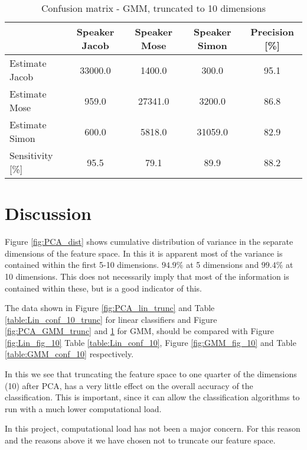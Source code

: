 \begin{table}[H]                                                    
\centering                                                          
\begin{tabular}{|l|c|c|c|c|}                                        
\hline                                                              
  & Speaker Jacob & Speaker Mose & Speaker Simon & Precision [\%] \\
\hline                                                              
Estimate Jacob & 33000.0 & 1400.0 & 300.0 & 95.1 \\                 
\hline                                                              
Estimate Mose & 959.0 & 27341.0 & 3200.0 & 86.8 \\                  
\hline                                                              
Estimate Simon & 600.0 & 5818.0 & 31059.0 & 82.9 \\                 
\hline                                                              
Sensitivity [\%] & 95.5 & 79.1 & 89.9 & 88.2 \\                     
\hline                                                              
\end{tabular}                                                       
\caption{Confusion matrix - GMM, truncated to 10 dimensions}        
\label{table:GMM_conf_10_trunc}                                     
\end{table} 



\section{Discussion}

Figure \ref{fig:PCA_dist} shows cumulative distribution of variance in the separate dimensions of the feature space.
In this it is apparent most of the variance is contained within the first 5-10 dimensions. 
$ 94.9 \% $ at 5 dimensions and $ 99.4 \% $ at 10 dimensions.
This does not necessarily imply that most of the information is contained within these, but is a good indicator of this.

The data shown in Figure \ref{fig:PCA_lin_trunc} and Table \ref{table:Lin_conf_10_trunc} for linear classifiers and Figure \ref{fig:PCA_GMM_trunc} and \ref{table:GMM_conf_10_trunc} for GMM, should be compared with Figure \ref{fig:Lin_fig_10} Table \ref{table:Lin_conf_10}, Figure \ref{fig:GMM_fig_10} and Table \ref{table:GMM_conf_10} respectively.

In this we see that truncating the feature space to one quarter of the dimensions (10) after PCA, has a very little effect on the overall accuracy of the classification.
This is important, since it can allow the classification algorithms to run with a much lower computational load.

In this project, computational load has not been a major concern. For this reason and the reasons above it we have chosen not to truncate our feature space.